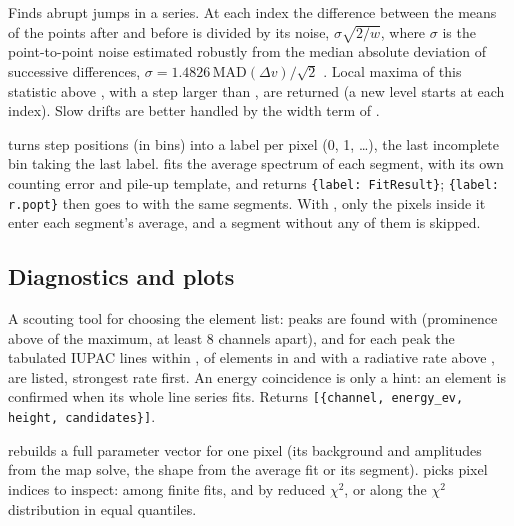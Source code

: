 Finds abrupt jumps in a series. At each index the difference between the means of the
 points after and before is divided by its noise, $\sigma\sqrt{2/w}$, where
$\sigma$ is the point-to-point noise estimated robustly from the median absolute deviation of
successive differences, $\sigma = 1.4826\,\mathrm{MAD}(\Delta v)/\sqrt2$ \citep{Hampel1974}.
Local maxima of this statistic above , with a step larger than ,
are returned (a new level starts at each index). Slow drifts are better handled by the width
term of .

 turns step positions (in bins) into a label per pixel (0, 1, \dots), the
last incomplete bin taking the last label.  fits the average spectrum of
each segment, with its own counting error and pile-up template, and returns
\texttt{\{label: FitResult\}}; \texttt{\{label: r.popt\}} then goes to  with the same
segments. With , only the pixels inside it enter each segment's average, and a
segment without any of them is skipped.

\subsection{Diagnostics and plots}

A scouting tool for choosing the element list: peaks are found with
 (prominence above  of the maximum, at least 8
channels apart), and for each peak the tabulated IUPAC lines within , of elements
in  and with a radiative rate above , are listed, strongest rate
first. An energy coincidence is only a hint: an element is confirmed when its whole line
series fits. Returns \texttt{[\{channel, energy\_ev, height, candidates\}]}.

 rebuilds a full parameter vector for one pixel (its background and
amplitudes from the map solve, the shape from the average fit or its segment).
 picks pixel indices to inspect:  among finite fits,
 and  by reduced $\chi^2$, or  along the $\chi^2$
distribution in equal quantiles.

